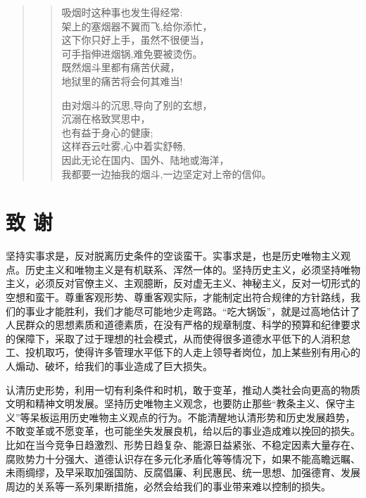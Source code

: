 \documentclass[openany,oneside]{book}
\theoremstyle{cthmstyle}
\theoremstyle{remark}
\begin{document}
\begin{quote}
\begin{verse}
        吸烟时这种事也发生得经常:\\
        \hspace{1em}架上的塞烟器不翼而飞,给你添忙，\\
        这下你只好上手，虽然不很便当，\\
        \hspace{1em}可手指伸进烟锅,难免要被烫伤。\\
        \hspace{2em}既然烟斗里都有痛苦伏藏，\\
        \hspace{2em}地狱里的痛苦将会何其难当!\\
        \vspace{1em}
        
        由对烟斗的沉思,导向了别的玄想，\\
        \hspace{1em}沉溺在格致冥思中，\\
        也有益于身心的健康;\\
        \hspace{1em}这样吞云吐雾,心中着实舒畅,\\
        \hspace{2em}因此无论在国内、国外、陆地或海洋，\\
        \hspace{2em}我都要一边抽我的烟斗,一边坚定对上帝的信仰。\\
    \end{verse}
\end{quote}



%
\clearpage
{}
{}
\nocite{*} %

\chapter*{致 \qquad 谢}
\thispagestyle{empty}

坚持实事求是，反对脱离历史条件的空谈蛮干。实事求是，也是历史唯物主义观点。历史主义和唯物主义是有机联系、浑然一体的。坚持历史主义，必须坚持唯物主义，必须反对官僚主义、主观臆断，反对虚无主义、神秘主义，反对一切形式的空想和蛮干。尊重客观形势、尊重客观实际，才能制定出符合规律的方针路线，我们的事业才能胜利，我们才能尽可能地少走弯路。“吃大锅饭”，就是过高地估计了人民群众的思想素质和道德素质，在没有严格的规章制度、科学的预算和纪律要求的保障下，采取了过于理想的社会模式，从而使得很多道德水平低下的人消积怠工、投机取巧，使得许多管理水平低下的人走上领导者岗位，加上某些别有用心的人煽动、破坏，给我们的事业造成了巨大损失。

认清历史形势，利用一切有利条件和时机，敢于变革，推动人类社会向更高的物质文明和精神文明发展。坚持历史唯物主义观念，也要防止那些“教条主义、保守主义”等呆板运用历史唯物主义观点的行为。不能清醒地认清形势和历史发展趋势，不敢变革或不愿变革，也可能坐失发展良机，给以后的事业造成难以挽回的损失。比如在当今竞争日趋激烈、形势日趋复杂、能源日益紧张、不稳定因素大量存在、腐败势力十分强大、道德认识存在多元化矛盾化等等情况下，如果不能高瞻远瞩、未雨绸缪，及早采取加强国防、反腐倡廉、利民惠民、统一思想、加强德育、发展周边的关系等一系列果断措施，必然会给我们的事业带来难以控制的损失。
\end{document}
